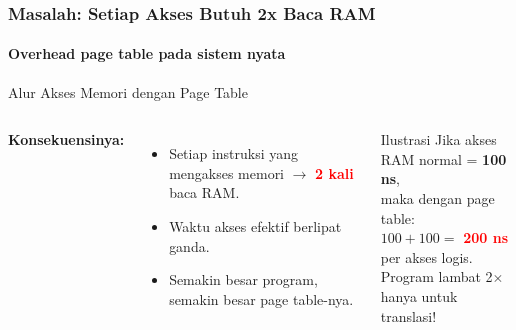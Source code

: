 \documentclass[t,aspectratio=169,xcolor=dvipsnames]{beamer}
\newcommand{\tem}[1]{\textbf{\textcolor{red}{#1}}}
\begin{document}
\begin{frame}
    \frametitle{Masalah: Setiap Akses Butuh 2x Baca RAM}
    \framesubtitle{Overhead page table pada sistem nyata}
    \small

    \begin{block}{Alur Akses Memori dengan Page Table}
        \centering
    \end{block}

    \vspace{0.3cm}
    \begin{columns}[T]
        \textbf{Konsekuensinya:}
        \begin{itemize}
            \item Setiap instruksi yang mengakses memori $\rightarrow$ \tem{2 kali} baca RAM.
            \item Waktu akses efektif berlipat ganda.
            \item Semakin besar program, semakin besar page table-nya.
        \end{itemize}

        \begin{alertblock}{Ilustrasi}
            Jika akses RAM normal = \textbf{100 ns},\\
            maka dengan page table:\\
            $100 + 100 = $ \tem{200 ns} per akses logis.\\
            \vspace{0.1cm}
            Program lambat 2$\times$ hanya untuk translasi!
        \end{alertblock}
    \end{columns}
\end{frame}
\end{document}

